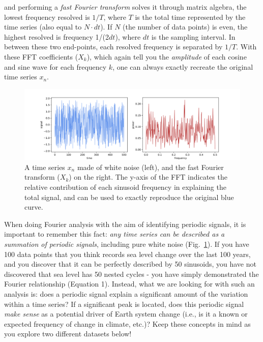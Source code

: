 \noindent and performing a \emph{fast Fourier transform} solves it through matrix algebra, the lowest frequency resolved is $1/T$, where $T$ is the total time represented by the time series (also equal to $N \cdot dt$). If $N$ (the number of data points) is even, the highest resolved is frequency 1/(2$dt$), where $dt$ is the sampling interval. In between these two end-points, each resolved frequency is separated by $1/T$. With these FFT coefficients ($X_k$), which again tell you the \emph{amplitude} of each cosine and sine wave for each frequency $k$, one can always exactly recreate the original time series $x_n$.

\begin{figure}[b!]
	\centering
	\includegraphics[width=1\textwidth]{figures/white_noise.png} %
	\caption{A time series $x_n$ made of white noise (left), and the fast Fourier transform ($X_k$) on the right. The y-axis of the FFT indicates the relative contribution of each sinusoid frequency in explaining the total signal, and can be used to exactly reproduce the original blue curve. }
		\label{fig:noise}
\end{figure}

\noindent When doing Fourier analysis with the aim of identifying periodic signals, it is important to remember this fact: \emph{any time series can be described as a summation of periodic signals}, including pure white noise (Fig.~\ref{fig:noise}). If you have 100 data points that you think records sea level change over the last 100 years, and you discover that it can be perfectly described by 50 sinusoids, you have not discovered that sea level has 50 nested cycles - you have simply demonstrated the Fourier relationship (Equation 1). Instead, what we are looking for with such an analysis is: does a periodic signal explain a significant amount of the variation within a time series? If a significant peak is located, does this periodic signal \emph{make sense} as a potential driver of Earth system change (i.e., is it a known or expected frequency of change in climate, etc.)? Keep these concepts in mind as you explore two different datasets below!
